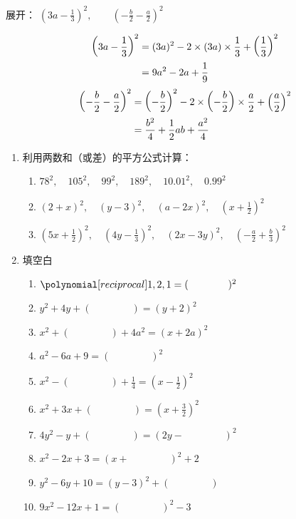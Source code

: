 \begin{example}
    展开：
    $\left(3a-\frac{1}{3}\right)^2,\qquad \left(-\frac{b}{2}-\frac{a}{2}\right)^2$
\end{example}


\begin{solution}
    \[\begin{split}
        \left(3a-\dfrac{1}{3}\right)^2&=(3a)^2-2\times(3a)\times\dfrac{1}{3}+\left(\dfrac{1}{3}\right)^2 \\
        &=  9a^2-2a+\dfrac{1}{9}
    \end{split}\]
    \[\begin{split}
        \left(-\dfrac{b}{2}-\dfrac{a}{2}\right)^2
        &=  \left(-\dfrac{b}{2}\right)^2-2\times\left(-\dfrac{b}{2}\right)\times\dfrac{a}{2}+\left(\dfrac{a}{2}\right)^2\\
        &=\dfrac{b^2}{4}+\dfrac{1}{2}ab+\dfrac{a^2}{4}
    \end{split}\]
\end{solution}

\begin{ex}
\begin{enumerate}
    \item 利用两数和（或差）的平方公式计算：
\begin{enumerate}
    \item $78^2,\quad 105^2,\quad 99^2,\quad 189^2,\quad 10.01^2,\quad 0.99^2$
    \item $(2+x)^2,\quad (y-3)^2,\quad (a-2x)^2,\quad \left(x+\frac{1}{2}\right)^2$ 
    \item $\left(5x+\frac{1}{2}\right)^2,\quad \left(4y-\frac{1}{3}\right)^2,\quad (2x-3y)^2,\quad \left(-\frac{a}{2}+\frac{b}{3}\right)^2$
\end{enumerate}
    
\item 填空白
\begin{enumerate}
    \item $\poly{1,2,1}=(\qquad\qquad)^2$
    \item $y^2+4y+(\qquad \qquad)=(y+2)^2$
    \item $x^2+(\qquad \qquad)+4a^2=(x+2a)^2$
    \item $a^2-6a+9=(\qquad \qquad)^2$
    \item $x^2-(\qquad \qquad)+\frac{1}{4}=\left(x-\frac{1}{2}\right)^2$
    \item $x^2+3x+(\qquad \qquad)=\left(x+\frac{3}{2}\right)^2$
    \item $4y^2-y+(\qquad \qquad)=(2y-\qquad \qquad)^2$
    \item $x^2-2x+3=(x+\qquad \qquad)^2+2$
    \item $y^2-6y+10=(y-3)^2+(\qquad \qquad)$
    \item $9x^2-12x+1=(\qquad \qquad)^2-3$
\end{enumerate}

\end{enumerate}    
\end{ex}

